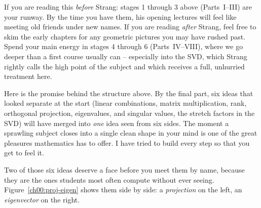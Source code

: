 \begin{strangbox}
If you are reading this \emph{before} Strang: stages 1 through 3 above (Parts~I--III) are your runway.
By the time you have them, his opening lectures will feel like meeting old friends
under new names. If you are reading \emph{after} Strang, feel free to skim the
early chapters for any geometric pictures you may have rushed past. Spend your main
energy in stages 4 through 6 (Parts~IV--VIII), where we go deeper than a first course
usually can -- especially into the SVD, which Strang rightly calls the high point of
the subject and which receives a full, unhurried treatment here.
\end{strangbox}

\begin{aestheticbox}
Here is the promise behind the structure above. By the final part,
six ideas that looked separate at the start (linear combinations, matrix
multiplication, rank, orthogonal projection, eigenvalues, and singular values, the
stretch factors in the SVD) will have merged into \emph{one} idea seen from six
sides. The moment a sprawling subject closes into a single clean shape in your mind
is one of the great pleasures mathematics has to offer. I have tried to build every
step so that you get to feel it.
\end{aestheticbox}

Two of those six ideas deserve a face before you meet them by name, because they
are the ones students most often compute without ever seeing. Figure~\ref{ch00:proj-eigen}
shows them side by side: a \emph{projection} on the left, an \emph{eigenvector} on
the right.

